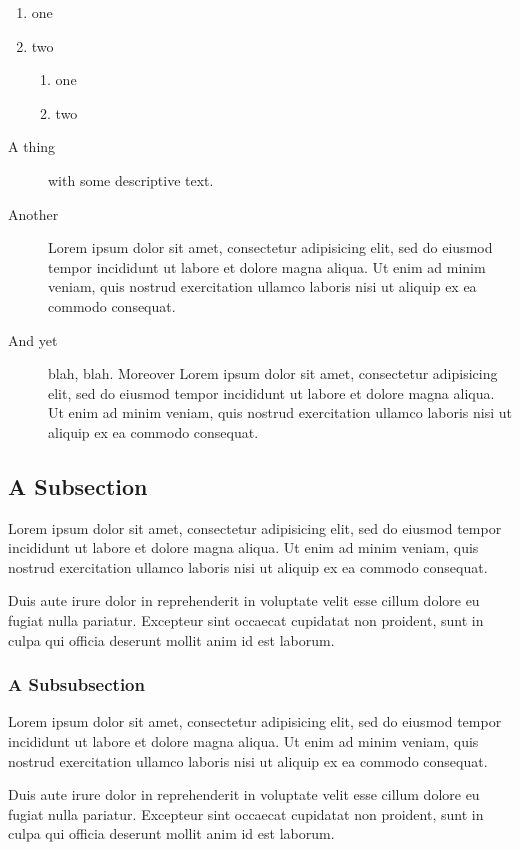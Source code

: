\documentclass{article}
\begin{document}
\begin{enumerate}
 \item one
 \item two
   \begin{enumerate}
    \item one
    \item two
   \end{enumerate}
\end{enumerate}

\begin{description}
\item[A thing] with some descriptive text.
\item[Another] Lorem ipsum dolor sit amet, consectetur adipisicing elit, sed do eiusmod tempor incididunt ut labore et dolore magna aliqua. Ut enim ad minim veniam, quis nostrud exercitation ullamco laboris nisi ut aliquip ex ea commodo consequat. 
\item[And yet] blah, blah. Moreover
Lorem ipsum dolor sit amet, consectetur adipisicing elit, sed do eiusmod tempor incididunt ut labore et dolore magna aliqua. Ut enim ad minim veniam, quis nostrud exercitation ullamco laboris nisi ut aliquip ex ea commodo consequat. 
\end{description}

\subsection{A Subsection}
Lorem ipsum dolor sit amet, consectetur adipisicing elit, sed do eiusmod tempor incididunt ut labore et dolore magna aliqua. Ut enim ad minim veniam, quis nostrud exercitation ullamco laboris nisi ut aliquip ex ea commodo consequat.

Duis aute irure dolor in reprehenderit in voluptate velit esse cillum dolore eu fugiat nulla pariatur. Excepteur sint occaecat cupidatat non proident, sunt in culpa qui officia deserunt mollit anim id est laborum.

\subsubsection{A Subsubsection}
Lorem ipsum dolor sit amet, consectetur adipisicing elit, sed do eiusmod tempor incididunt ut labore et dolore magna aliqua. Ut enim ad minim veniam, quis nostrud exercitation ullamco laboris nisi ut aliquip ex ea commodo consequat.

Duis aute irure dolor in reprehenderit in voluptate velit esse cillum dolore eu fugiat nulla pariatur. Excepteur sint occaecat cupidatat non proident, sunt in culpa qui officia deserunt mollit anim id est laborum.
\end{document}
